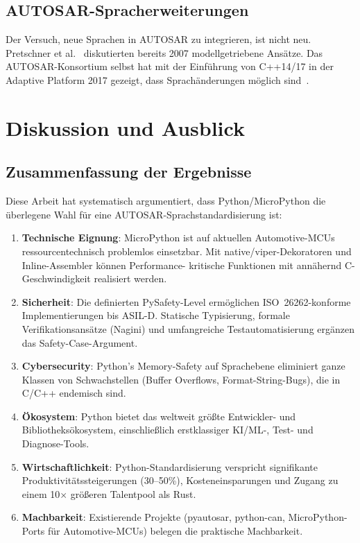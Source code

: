 ﻿\documentclass[12pt,a4paper,twoside]{article}
\begin{document}
\subsection{AUTOSAR-Spracherweiterungen}

Der Versuch, neue Sprachen in AUTOSAR zu integrieren, ist nicht neu.
Pretschner et al.~\cite{pretschner2007software} diskutierten bereits 2007 modellgetriebene
Ansätze. Das AUTOSAR-Konsortium selbst hat mit der Einführung von C++14/17
in der Adaptive Platform 2017 gezeigt, dass Sprachänderungen möglich sind~\cite{autosar_ap_explained2019}.

\section{Diskussion und Ausblick}
\label{sec:fazit}

\subsection{Zusammenfassung der Ergebnisse}
\label{subsec:zusammenfassung}

Diese Arbeit hat systematisch argumentiert, dass Python/MicroPython
die überlegene Wahl für eine AUTOSAR-Sprachstandardisierung ist:

\begin{enumerate}
  \item \textbf{Technische Eignung}: MicroPython ist auf aktuellen
        Automotive-MCUs ressourcentechnisch problemlos einsetzbar.
        Mit native/viper-Dekoratoren und Inline-Assembler können Performance-
        kritische Funktionen mit annähernd C-Geschwindigkeit realisiert werden.
  \item \textbf{Sicherheit}: Die definierten PySafety-Level ermöglichen
        ISO~26262-konforme Implementierungen bis ASIL-D.
        Statische Typisierung, formale Verifikationsansätze (Nagini)
        und umfangreiche Testautomatisierung ergänzen das Safety-Case-Argument.
  \item \textbf{Cybersecurity}: Python's Memory-Safety auf Sprachebene
        eliminiert ganze Klassen von Schwachstellen (Buffer Overflows,
        Format-String-Bugs), die in C/C++ endemisch sind.
  \item \textbf{Ökosystem}: Python bietet das weltweit größte Entwickler-
        und Bibliotheksökosystem, einschließlich erstklassiger KI/ML-,
        Test- und Diagnose-Tools.
  \item \textbf{Wirtschaftlichkeit}: Python-Standardisierung verspricht
        signifikante Produktivitätssteigerungen (30--50\%), Kosteneinsparungen
        und Zugang zu einem 10$\times$ größeren Talentpool als Rust.
  \item \textbf{Machbarkeit}: Existierende Projekte (pyautosar, python-can,
        MicroPython-Ports für Automotive-MCUs) belegen die praktische
        Machbarkeit.
\end{enumerate}
\end{document}
